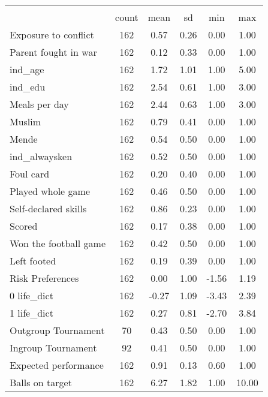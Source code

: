 {
\def\sym#1{\ifmmode^{#1}\else\(^{#1}\)\fi}
\begin{tabular}{l*{1}{ccccc}}
\hline\hline
                    &\multicolumn{5}{c}{}                                            \\
                    &       count&        mean&          sd&         min&         max\\
\hline
Exposure to conflict&         162&        0.57&        0.26&        0.00&        1.00\\
Parent fought in war&         162&        0.12&        0.33&        0.00&        1.00\\
ind\_age             &         162&        1.72&        1.01&        1.00&        5.00\\
ind\_edu             &         162&        2.54&        0.61&        1.00&        3.00\\
Meals per day       &         162&        2.44&        0.63&        1.00&        3.00\\
Muslim              &         162&        0.79&        0.41&        0.00&        1.00\\
Mende               &         162&        0.54&        0.50&        0.00&        1.00\\
ind\_alwaysken       &         162&        0.52&        0.50&        0.00&        1.00\\
Foul card           &         162&        0.20&        0.40&        0.00&        1.00\\
Played whole game   &         162&        0.46&        0.50&        0.00&        1.00\\
Self-declared skills&         162&        0.86&        0.23&        0.00&        1.00\\
Scored              &         162&        0.17&        0.38&        0.00&        1.00\\
Won the football game&         162&        0.42&        0.50&        0.00&        1.00\\
Left footed         &         162&        0.19&        0.39&        0.00&        1.00\\
Risk Preferences    &         162&        0.00&        1.00&       -1.56&        1.19\\
0 life\_dict         &         162&       -0.27&        1.09&       -3.43&        2.39\\
1 life\_dict         &         162&        0.27&        0.81&       -2.70&        3.84\\
Outgroup Tournament &          70&        0.43&        0.50&        0.00&        1.00\\
Ingroup Tournament  &          92&        0.41&        0.50&        0.00&        1.00\\
Expected performance&         162&        0.91&        0.13&        0.60&        1.00\\
Balls on target     &         162&        6.27&        1.82&        1.00&       10.00\\
\hline\hline
\end{tabular}
}
